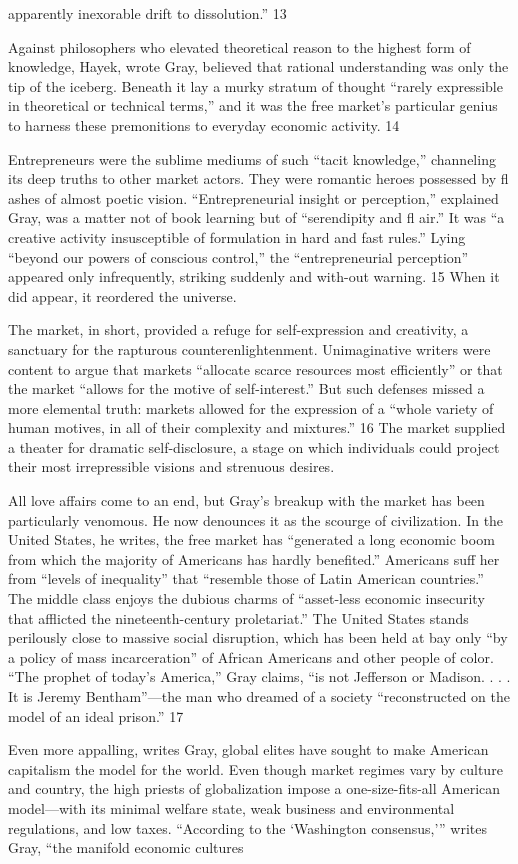 apparently inexorable drift to dissolution.” {\color{blue} 13 } {\par} Against philosophers who elevated theoretical reason to the highest form of knowledge, Hayek, wrote Gray, believed that rational understanding was only the tip of the iceberg. Beneath it lay a murky stratum of thought “rarely expressible in theoretical or technical terms,” and it was the free market’s particular genius to harness these premonitions to everyday economic activity. {\color{blue} 14 } {\par} Entrepreneurs were the sublime mediums of such “tacit knowledge,” channeling its deep truths to other market actors. They were romantic heroes possessed by fl ashes of almost poetic vision. “Entrepreneurial insight or perception,” explained Gray, was a matter not of book learning but of “serendipity and fl air.” It was “a creative activity insusceptible of formulation in hard and fast rules.” Lying “beyond our powers of conscious control,” the “entrepreneurial perception” appeared only infrequently, striking suddenly and with-out warning. {\color{blue} 15 } When it did appear, it reordered the universe.{\par} The market, in short, provided a refuge for self-expression and creativity, a sanctuary for the rapturous counterenlightenment. Unimaginative writers were content to argue that markets “allocate scarce resources most efficiently” or that the market “allows for the motive of self-interest.” But such defenses missed a more elemental truth: markets allowed for the expression of a “whole variety of human motives, in all of their complexity and mixtures.” {\color{blue} 16 } The market supplied a theater for dramatic self-disclosure, a stage on which individuals could project their most irrepressible visions and strenuous desires.{\par} All love affairs come to an end, but Gray’s breakup with the market has been particularly venomous. He now denounces it as the scourge of civilization. In the United States, he writes, the free market has “generated a long economic boom from which the majority of Americans has hardly benefited.” Americans suff her from “levels of inequality” that “resemble those of Latin American countries.” The middle class enjoys the dubious charms of “asset-less economic insecurity that afflicted the nineteenth-century proletariat.” The United States stands perilously close to massive social disruption, which has been held at bay only “by a policy of mass incarceration” of African Americans and other people of color. “The prophet of today’s America,” Gray claims, “is not Jefferson or Madison. . . . It is Jeremy Bentham”—the man who dreamed of a society “reconstructed on the model of an ideal prison.” {\color{blue} 17 } {\par} Even more appalling, writes Gray, global elites have sought to make American capitalism the model for the world. Even though market regimes vary by culture and country, the high priests of globalization impose a one-size-fits-all American model—with its minimal welfare state, weak business and environmental regulations, and low taxes. “According to the ‘Washington consensus,’” writes Gray, “the manifold economic cultures 
